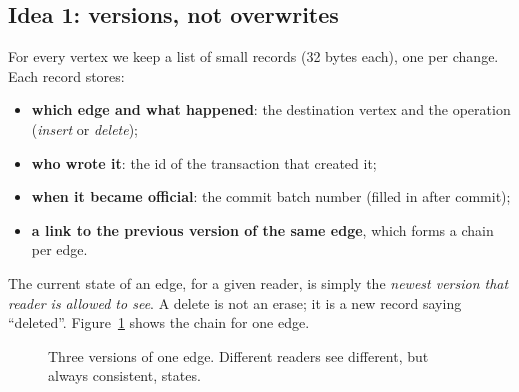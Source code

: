 \documentclass[11pt,a4paper]{article}
\begin{document}
\subsection{Idea 1: versions, not overwrites}
For every vertex we keep a list of small records (32 bytes each), one per change. Each record stores:
\begin{itemize}
\item \textbf{which edge and what happened}: the destination vertex and the operation (\emph{insert} or \emph{delete});
\item \textbf{who wrote it}: the id of the transaction that created it;
\item \textbf{when it became official}: the commit batch number (filled in after commit);
\item \textbf{a link to the previous version of the same edge}, which forms a chain per edge.
\end{itemize}

The current state of an edge, for a given reader, is simply the \emph{newest version that reader is allowed to see}.
A delete is not an erase; it is a new record saying ``deleted''. Figure~\ref{fig:chain} shows the chain for one edge.

\begin{figure}[H]
\centering
{}
\caption{Three versions of one edge. Different readers see different, but always consistent, states.}
\label{fig:chain}
\end{figure}
\end{document}
